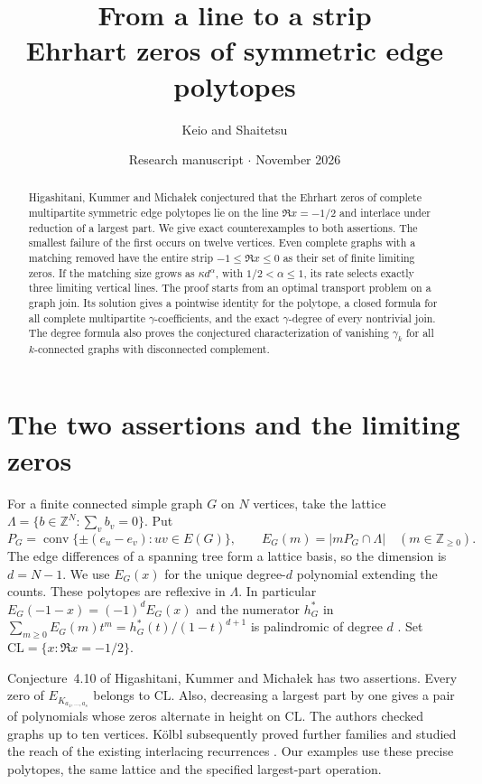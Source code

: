 \documentclass[11pt,a4paper]{article}
\title{\color{ink}\bfseries From a line to a strip\\[3pt]\Large Ehrhart zeros of symmetric edge polytopes}
\author{Keio and Shaitetsu}
\date{Research manuscript \enspace$\cdot$\enspace 20 November 2026}
\theoremstyle{definition}\newtheorem{problem}[theorem]{Problem}
\begin{document}
\maketitle
\begin{abstract}
Higashitani, Kummer and Micha\l{}ek conjectured that the Ehrhart zeros of complete multipartite symmetric edge polytopes lie on the line $\Re x=-1/2$ and interlace under reduction of a largest part. We give exact counterexamples to both assertions. The smallest failure of the first occurs on twelve vertices. Even complete graphs with a matching removed have the entire strip $-1\le\Re x\le0$ as their set of finite limiting zeros. If the matching size grows as $\kappa d^\alpha$, with $1/2<\alpha\le1$, its rate selects exactly three limiting vertical lines. The proof starts from an optimal transport problem on a graph join. Its solution gives a pointwise identity for the polytope, a closed formula for all complete multipartite $\gamma$-coefficients, and the exact $\gamma$-degree of every nontrivial join. The degree formula also proves the conjectured characterization of vanishing $\gamma_k$ for all $k$-connected graphs with disconnected complement.
\end{abstract}

\section{The two assertions and the limiting zeros}
For a finite connected simple graph $G$ on $N$ vertices, take the lattice
$\Lambda=\{b\in\mathbb Z^N:\sum_v b_v=0\}$. Put
\[
 P_G=\operatorname{conv}\{\pm(e_u-e_v):uv\in E(G)\},\qquad
 E_G(m)=|mP_G\cap\Lambda|\quad(m\in\mathbb Z_{\ge0}).
\]
The edge differences of a spanning tree form a lattice basis, so the dimension is $d=N-1$. We use $E_G(x)$ for the unique degree-$d$ polynomial extending the counts. These polytopes are reflexive in $\Lambda$. In particular $E_G(-1-x)=(-1)^dE_G(x)$ and the numerator $h^*_G$ in $\sum_{m\ge0}E_G(m)t^m=h^*_G(t)/(1-t)^{d+1}$ is palindromic of degree $d$ \cite[Section~2.1]{HKM}. Set $\mathrm{CL}=\{x:\Re x=-1/2\}$.

Conjecture~4.10 of Higashitani, Kummer and Micha\l{}ek \cite{HKM} has two assertions. Every zero of $E_{K_{a_1,\ldots,a_s}}$ belongs to $\mathrm{CL}$. Also, decreasing a largest part by one gives a pair of polynomials whose zeros alternate in height on $\mathrm{CL}$. The authors checked graphs up to ten vertices. K\"olbl subsequently proved further families and studied the reach of the existing interlacing recurrences \cite{Kolbl}. Our examples use these precise polytopes, the same lattice and the specified largest-part operation.
\end{document}
